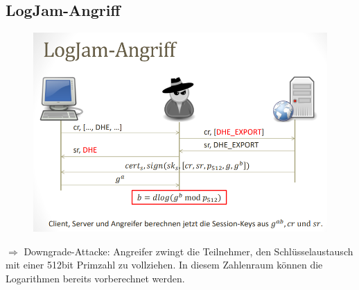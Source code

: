 \subsection{LogJam-Angriff}
\begin{figure}[H]
	\begin{center}
		\includegraphics[scale=0.7]{Resources/LogJam}
		\caption{}
		\label{fig:LogJam}
	\end{center}
\end{figure}
$\Rightarrow$ Downgrade-Attacke: Angreifer zwingt die Teilnehmer, den Schlüsselaustausch mit einer 512bit Primzahl zu vollziehen. In diesem Zahlenraum können die Logarithmen bereits vorberechnet werden.

